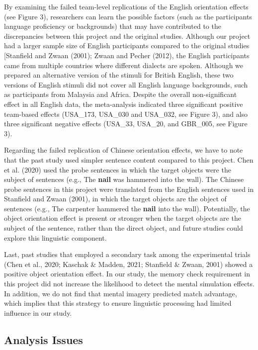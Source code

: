 \documentclass[
  man,floatsintext]{apa7}
\begin{document}
By examining the failed team-level replications of the English
orientation effects (see Figure 3), researchers can learn the possible
factors (such as the participants\textquotesingle{} language proficiency or backgrounds)
that may have contributed to the discrepancies between this project and
the original studies. Although our project had a larger sample size of
English participants compared to the original studies
{[}Stanfield and Zwaan (2001); Zwaan and Pecher (2012), the
English participants came from multiple countries where different
dialects are spoken. Although we prepared an alternative version of the
stimuli for British English, these two versions of English stimuli did
not cover all English language backgrounds, such as participants from
Malaysia and Africa. Despite the overall non-significant effect in all
English data, the meta-analysis indicated three significant positive
team-based effects (USA\_173, USA\_030 and USA\_032, see Figure 3), and
also three significant negative effects (USA\_33, USA\_20, and GBR\_005,
see Figure 3).

Regarding the failed replication of Chinese orientation effects, we have
to note that the past study used simpler sentence content compared to
this project. Chen et al. (2020) used the probe sentences in which
the target objects were the subject of sentences (e.g., The \textbf{nail} was
hammered into the wall). The Chinese probe sentences in this project
were translated from the English sentences used in
Stanfield and Zwaan (2001), in which the target objects are the object of
sentences (e.g., The carpenter hammered the \textbf{nail} into the wall).
Potentially, the object orientation effect is present or stronger when
the target objects are the subject of the sentence, rather than the
direct object, and future studies could explore this linguistic
component.~

Last, past studies that employed a secondary task among the experimental
trials (Chen et al., 2020; Kaschak \& Madden, 2021; Stanfield \& Zwaan, 2001) showed a positive object orientation effect. In
our study, the memory check requirement in this project did not increase
the likelihood to detect the mental simulation effects. In addition, we
do not find that mental imagery predicted match advantage, which implies
that this strategy to ensure linguistic processing had limited influence
in our study.

\hypertarget{analysis-issues}{%
\subsection{Analysis Issues}\label{analysis-issues}}
\end{document}
